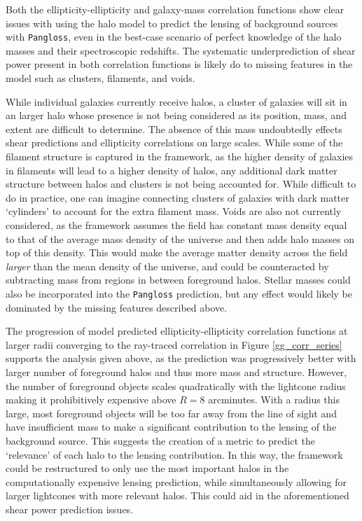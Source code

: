 \documentclass[%
 reprint,
 amsmath,amssymb,
 aps,nofootinbib
]{revtex4-1}
\begin{document}
Both the ellipticity-ellipticity and galaxy-mass correlation functions show clear issues with using the halo model to predict the lensing of background sources with \texttt{Pangloss}, even in the best-case scenario of perfect knowledge of the halo masses and their spectroscopic redshifts. The systematic underprediction of shear power present in both correlation functions is likely do to missing features in the model such as clusters, filaments, and voids. 

While individual galaxies currently receive halos, a cluster of galaxies will sit in an larger halo whose presence is not being considered as its position, mass, and extent are difficult to determine. The absence of this mass undoubtedly effects shear predictions and ellipticity correlations on large scales. While some of the filament structure is captured in the framework, as the higher density of galaxies in filaments will lead to a higher density of halos, any additional dark matter structure between halos and clusters is not being accounted for. While difficult to do in practice, one can imagine connecting clusters of galaxies with dark matter `cylinders' to account for the extra filament mass. Voids are also not currently considered, as the framework assumes the field has constant mass density equal to that of the average mass density of the universe and then adds halo masses on top of this density. This would make the average matter density across the field \textit{larger} than the mean density of the universe, and could be counteracted by subtracting mass from regions in between foreground halos. Stellar masses could also be incorporated into the \texttt{Pangloss} prediction, but any effect would likely be dominated by the missing features described above.

The progression of model predicted ellipticity-ellipticity correlation functions at larger radii converging to the ray-traced correlation in Figure \ref{gg_corr_series} supports the analysis given above, as the prediction was progressively better with larger number of foreground halos and thus more mass and structure. However, the number of foreground objects scales quadratically with the lightcone radius making it prohibitively expensive above $R=8$ arcminutes. With a radius this large, most foreground objects will be too far away from the line of sight and have insufficient mass to make a significant contribution to the lensing of the background source. This suggests the creation of a metric to predict the `relevance' of each halo to the lensing contribution. In this way, the framework could be restructured to only use the most important halos in the computationally expensive lensing prediction, while simultaneously allowing for larger lightcones with more relevant halos. This could aid in the aforementioned shear power prediction issues.  
\end{document}
